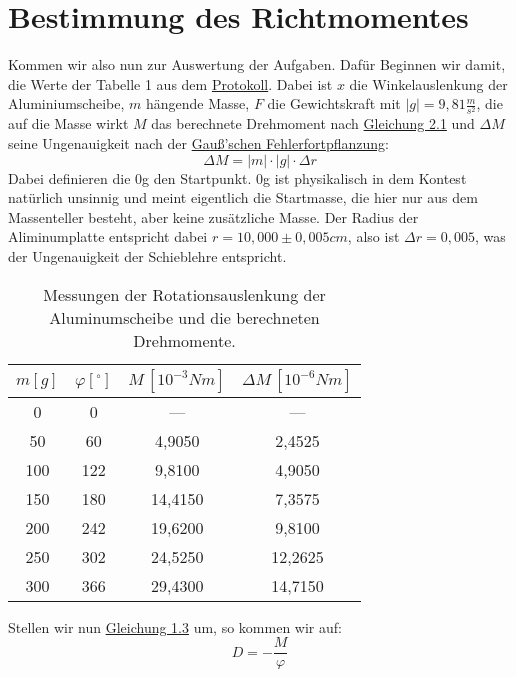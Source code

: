 \twocolumn

\section{Bestimmung des Richtmomentes}
Kommen wir also nun zur Auswertung der Aufgaben. Dafür Beginnen wir damit, die Werte der Tabelle 1  aus dem \hyperref[Protokoll]{Protokoll}.
Dabei ist $x$ die Winkelauslenkung der Aluminiumscheibe, $m$ hängende Masse, $F$ die Gewichtskraft mit $\left| g \right| =9,81 \frac{m}{s^2}$, die auf die Masse wirkt $M$ das berechnete Drehmoment nach \hyperref[eq:gleichgewichts_zustand]{Gleichung 2.1} und $\Delta M$ seine Ungenauigkeit nach der \hyperref[eq:gauss_fehlfortpflanzung]{Gauß'schen Fehlerfortpflanzung}:
\begin{equation}
    \Delta M = \left| m \right| \cdot \left| g \right| \cdot \Delta r
\end{equation}
Dabei definieren die 0g den Startpunkt. 0g ist physikalisch in dem Kontest natürlich unsinnig und meint eigentlich die Startmasse, die hier nur aus dem Massenteller besteht, aber keine zusätzliche Masse.
Der Radius der Aliminumplatte entspricht dabei $r = 10,000 \pm 0,005 cm$, also ist $\Delta r = 0,005$, was der Ungenauigkeit der Schieblehre entspricht.
\begin{table}[h!]
    \begin{tabular}{c | c | c | c }
    $m [g]$ & $\varphi [^{\circ}]$ & $M \, [10^{-3}Nm]$ & $\Delta M \, [10^{-6}Nm]$ \\
    \hline
    0   & 0   & ---     &  ---    \\
    50  & 60  &  4,9050 &  2,4525 \\
    100 & 122 &  9,8100 &  4,9050 \\
    150 & 180 & 14,4150 &  7,3575 \\
    200 & 242 & 19,6200 &  9,8100 \\
    250 & 302 & 24,5250 & 12,2625 \\
    300 & 366 & 29,4300 & 14,7150 \\
    \hline
    \end{tabular}
    \caption{Messungen der Rotationsauslenkung der Aluminumscheibe und die berechneten Drehmomente.}
    \label{tab:verschiedene_massen_winkel_auslenkung}
\end{table}

Stellen wir nun \hyperref[eq:kraft_drehmoment_zusammenhang]{Gleichung 1.3} um, so kommen wir auf:
\begin{equation}
    D = - \frac{M}{\varphi}
\end{equation}


